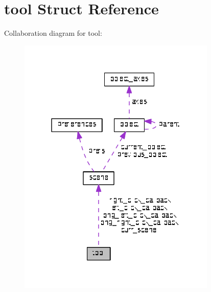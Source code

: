 \hypertarget{structtool}{}\section{tool Struct Reference}
\label{structtool}


Collaboration diagram for tool\+:\nopagebreak
\begin{figure}[H]
\begin{center}
\leavevmode
\includegraphics[width=268pt]{structtool__coll__graph}
\end{center}
\end{figure}
